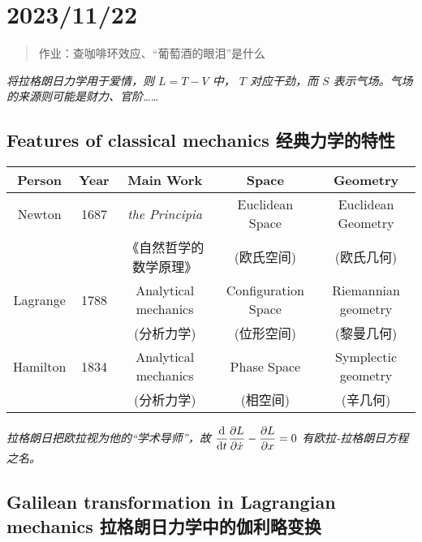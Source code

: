 \chapter{2023/11/22}\label{20231122}

\begin{quote}
作业：查咖啡环效应、``葡萄酒的眼泪''是什么
\end{quote}

\emph{将拉格朗日力学用于爱情，则 \(L = T - V\) 中， \(T\) 对应干劲，而
\(S\) 表示气场。气场的来源则可能是财力、官阶\ldots\ldots{}}

\section{Features of classical mechanics
经典力学的特性}\label{features-of-classical-mechanics-ux7ecfux5178ux529bux5b66ux7684ux7279ux6027}

\begin{center}
    \begin{tabular}{|c|c|c|c|c|}
        \hline
        \textbf{Person} & \textbf{Year} & \textbf{Main Work} & \textbf{Space} & \textbf{Geometry} \\
        \hline
        Newton & 1687 & \textit{the Principia} & Euclidean Space & Euclidean Geometry \\ 
        &  & 《自然哲学的数学原理》 & (欧氏空间) & (欧氏几何) \\
        \hline
        Lagrange & 1788 & Analytical mechanics & Configuration Space & Riemannian geometry \\ 
        &  & (分析力学) & (位形空间) & (黎曼几何) \\
        \hline
        Hamilton & 1834 & Analytical mechanics & Phase Space & Symplectic geometry \\ 
        &  & (分析力学) & (相空间) & (辛几何) \\
        \hline
    \end{tabular}
\end{center}

\emph{拉格朗日把欧拉视为他的``学术导师''，故
\(\displaystyle {\mathrm d \over \mathrm dt} {\partial L \over \partial \dot x}- {\partial L \over \partial x}=0\)
有欧拉-拉格朗日方程之名。}

\section[Galilean transformation in Lagrangian mechanics]{Galilean transformation in Lagrangian mechanics
拉格朗日力学中的伽利略变换}\label{galilean-transformation-in-lagrangian-mechanics-ux62c9ux683cux6717ux65e5ux529bux5b66ux4e2dux7684ux4f3dux5229ux7565ux53d8ux6362}


